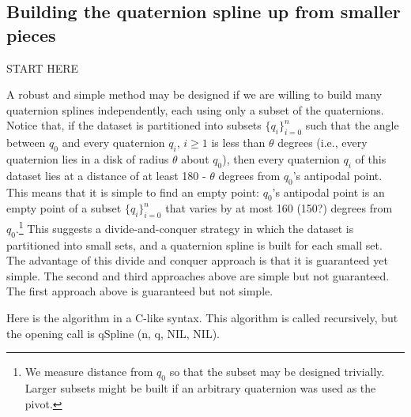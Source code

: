 \documentclass[11pt]{article}
\begin{document}

\subsection{Building the quaternion spline up from smaller pieces}
\label{sec:divide}

START HERE

A robust and simple method may be designed if we are willing to build many
quaternion splines independently, each using only a subset of the quaternions.
Notice that, if the dataset is partitioned into subsets $\{q_i\}_{i=0}^n$ such that
the angle between $q_0$ and every quaternion $q_i$, $i \geq 1$ is less than $\theta$
degrees (i.e., every quaternion lies in a disk of radius $\theta$ about $q_0$),
then every quaternion $q_i$ of this dataset lies at a distance of at least 180 - $\theta$
degrees from $q_0$'s antipodal point.
This means that it is simple to find an empty point:
$q_0$'s antipodal point is an empty point of a subset $\{q_i\}_{i=0}^n$ that varies
by at most 160 (150?) degrees from $q_0$.\footnote{We measure distance
  from $q_0$ so that the subset may be designed trivially.  Larger subsets
  might be built if an arbitrary quaternion was used as the pivot.}
This suggests a divide-and-conquer strategy in which the dataset is partitioned
into small sets, and a quaternion spline is built for each small set.
The advantage of this divide and conquer approach is that it is guaranteed yet simple.
The second and third approaches above are simple but not guaranteed.
The first approach above is guaranteed but not simple.

Here is the algorithm in a C-like syntax.
This algorithm is called recursively, but the opening call is qSpline (n, q, NIL, NIL).
\end{document}
